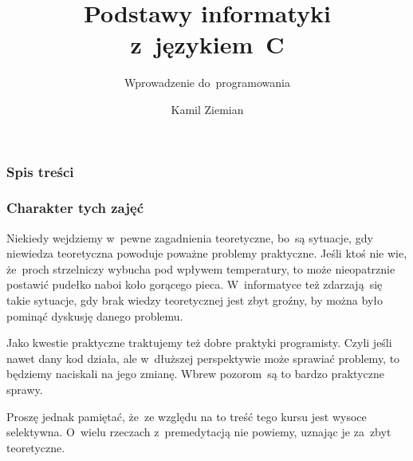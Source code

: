 \documentclass[10pt,t]{beamer}
\title{Podstawy informatyki z~językiem~C}
\subtitle{Wprowadzenie do~programowania}
\author{Kamil Ziemian \\
  \email}
\begin{document}





\RaggedRight





\maketitle





\begin{frame}
  \frametitle{Spis treści}


  \tableofcontents

\end{frame}










\begin{frame}
  \frametitle{Charakter tych zajęć}


  Niekiedy wejdziemy w~pewne zagadnienia teoretyczne, bo~są sytuacje, gdy
  niewiedza teoretyczna powoduje poważne problemy praktyczne. Jeśli ktoś
  nie wie, że~proch strzelniczy wybucha pod wpływem temperatury, to może
  nieopatrznie postawić pudełko naboi koło gorącego pieca. W~informatyce
  też zdarzają~się takie sytuacje, gdy brak wiedzy teoretycznej jest zbyt
  groźny, by można było pominąć dyskusję danego problemu.

  Jako kwestie praktyczne traktujemy też dobre praktyki programisty.
  Czyli jeśli nawet dany kod działa, ale w~dłuższej perspektywie może
  sprawiać problemy, to będziemy naciskali na jego zmianę. Wbrew
  pozorom~są to bardzo praktyczne sprawy.

  Proszę jednak pamiętać, że~ze względu na to treść tego kursu jest wysoce
  selektywna. O~wielu rzeczach z~premedytacją nie powiemy, uznając je
  za~zbyt teoretyczne.

\end{frame}
\end{document}
